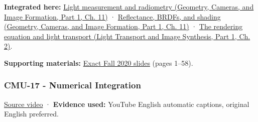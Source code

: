 \textbf{Integrated here:} \href{../03-Geometry-Cameras-and-Image-Formation-P01/main.pdf\#nameddest=03-visual-computing-i-ch004-light-measurement-and-radiometry}{Light measurement and radiometry (Geometry, Cameras, and Image Formation, Part 1, Ch. 11)} · \href{../03-Geometry-Cameras-and-Image-Formation-P01/main.pdf\#nameddest=03-visual-computing-i-ch004-reflectance-brdfs-and-shading}{Reflectance, BRDFs, and shading (Geometry, Cameras, and Image Formation, Part 1, Ch. 11)} · \href{../04-Light-Transport-and-Image-Synthesis-P01/main.pdf\#nameddest=03-visual-computing-i-ch007-the-rendering-equation-and-light-transport}{The rendering equation and light transport (Light Transport and Image Synthesis, Part 1, Ch. 2)}.

\textbf{Supporting materials:} \href{https://15462.courses.cs.cmu.edu/fall2020content/lectures/16_renderingequation/16_renderingequation_slides.pdf}{Exact Fall 2020 slides} (pages 1--58).

\subsubsection{CMU-17 - Numerical Integration}\label{04-visual-computing-ii-ch036-cmu-17---numerical-integration}

\hypertarget{04-visual-computing-ii-ch036-cmu-17---numerical-integration}{}

\href{https://www.youtube.com/watch?v=EGNZm9m382s}{Source video} · \textbf{Evidence used:} YouTube English automatic captions, original English preferred.


